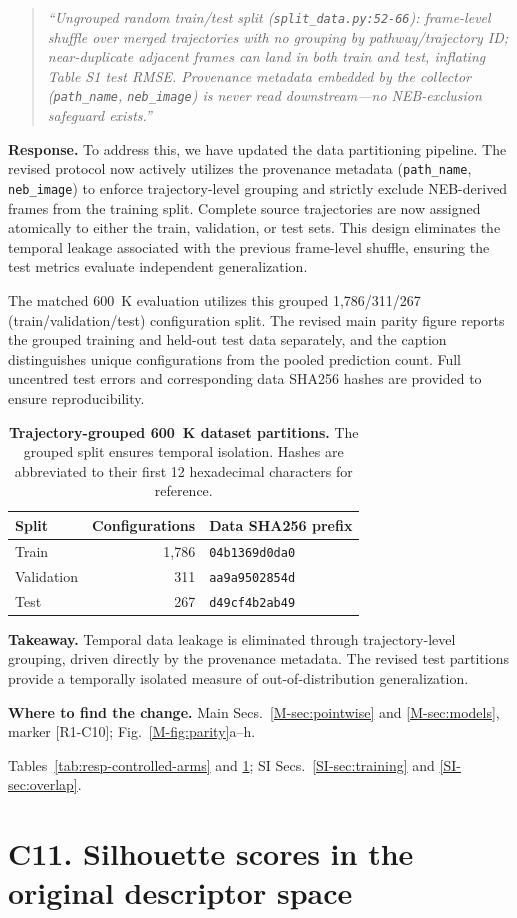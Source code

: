 \documentclass[11pt]{article}
\newcommand{\location}[2]{\par{\small\textbf{Where to find the change.} #1\par #2}\par}
\begin{document}
\begin{quote}\small \itshape
``Ungrouped random train/test split (\texttt{split\_data.py:52-66}): frame-level shuffle over merged trajectories with no grouping by pathway/trajectory ID; near-duplicate adjacent frames can land in both train and test, inflating Table S1 test RMSE. Provenance metadata embedded by the collector (\texttt{path\_name}, \texttt{neb\_image}) is never read downstream---no NEB-exclusion safeguard exists.''\end{quote}

\textbf{Response.} 
To address this, we have updated the data partitioning pipeline. The revised protocol now actively utilizes the provenance metadata (\texttt{path\_name}, \texttt{neb\_image}) to enforce trajectory-level grouping and strictly exclude NEB-derived frames from the training split. Complete source trajectories are now assigned atomically to either the train, validation, or test sets. This design eliminates the temporal leakage associated with the previous frame-level shuffle, ensuring the test metrics evaluate independent generalization.

The matched 600~K evaluation utilizes this grouped 1,786/311/267 (train/validation/test) configuration split. The revised main parity figure reports the grouped training and held-out test data separately, and the caption distinguishes unique configurations from the pooled prediction count. Full uncentred test errors and corresponding data SHA256 hashes are provided to ensure reproducibility. 

\begin{table}[!htbp]
\centering\small
\caption{\textbf{Trajectory-grouped 600~K dataset partitions.} The grouped split ensures temporal isolation. Hashes are abbreviated to their first 12 hexadecimal characters for reference.}
\smallskip
\label{tab:resp-c10-grouped-split}
\begin{tabular}{lrl}
\toprule
Split & Configurations & Data SHA256 prefix \\
\midrule
Train & 1,786 & \texttt{04b1369d0da0} \\
Validation & 311 & \texttt{aa9a9502854d} \\
Test & 267 & \texttt{d49cf4b2ab49} \\
\bottomrule
\end{tabular}
\end{table}

\textbf{Takeaway.} Temporal data leakage is eliminated through trajectory-level grouping, driven directly by the provenance metadata. The revised test partitions provide a temporally isolated measure of out-of-distribution generalization.
\location{Main Secs.~\ref{M-sec:pointwise} and \ref{M-sec:models}, marker [R1-C10]; Fig.~\ref{M-fig:parity}a--h.}{Tables~\ref{tab:resp-controlled-arms} and \ref{tab:resp-c10-grouped-split}; SI Secs.~\ref{SI-sec:training} and \ref{SI-sec:overlap}.}
\section*{C11. Silhouette scores in the original descriptor space}
\end{document}
